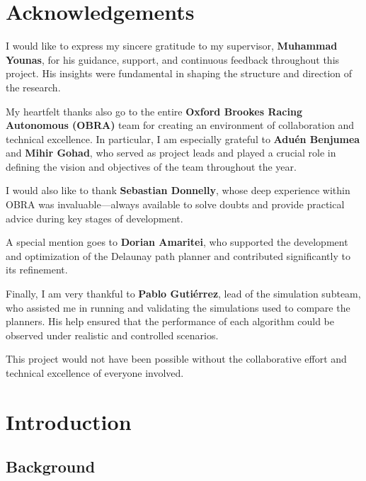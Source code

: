 \documentclass[a4paper,11pt]{report}
\begin{document}
\chapter*{Acknowledgements}

I would like to express my sincere gratitude to my supervisor, \textbf{Muhammad Younas}, for his guidance, support, and continuous feedback throughout this project. His insights were fundamental in shaping the structure and direction of the research.

My heartfelt thanks also go to the entire \textbf{Oxford Brookes Racing Autonomous (OBRA)} team for creating an environment of collaboration and technical excellence. In particular, I am especially grateful to \textbf{Aduén Benjumea} and \textbf{Mihir Gohad}, who served as project leads and played a crucial role in defining the vision and objectives of the team throughout the year.

I would also like to thank \textbf{Sebastian Donnelly}, whose deep experience within OBRA was invaluable—always available to solve doubts and provide practical advice during key stages of development. 

A special mention goes to \textbf{Dorian Amaritei}, who supported the development and optimization of the Delaunay path planner and contributed significantly to its refinement.

Finally, I am very thankful to \textbf{Pablo Gutiérrez}, lead of the simulation subteam, who assisted me in running and validating the simulations used to compare the planners. His help ensured that the performance of each algorithm could be observed under realistic and controlled scenarios.

This project would not have been possible without the collaborative effort and technical excellence of everyone involved.

\newpage


\chapter{Introduction}
\section{Background}
\end{document}
